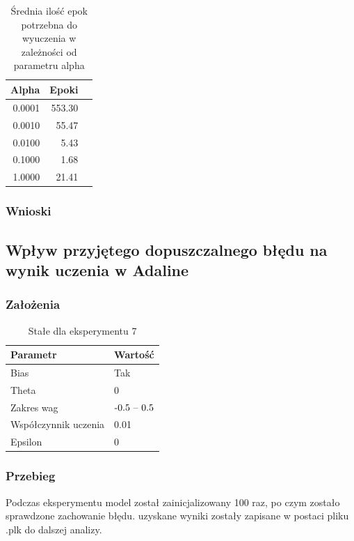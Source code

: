 \documentclass{article}
\begin{document}
\begin{table}[!h]
	\caption{Średnia ilość epok potrzebna do wyuczenia w zależności od parametru alpha}
	\label{tabela-res-6}
	\centering
	\begin{tabular}{rrr}
		\toprule
		Alpha  & Epoki  \\
		\midrule
		0.0001 & 553.30 \\
		0.0010 & 55.47  \\
		0.0100 & 5.43   \\
		0.1000 & 1.68   \\
		1.0000 & 21.41  \\
		\bottomrule
	\end{tabular}
\end{table}

\subsubsection*{Wnioski}

\newpage
\subsection{Wpływ przyjętego dopuszczalnego błędu na wynik uczenia w Adaline}
\subsubsection*{Założenia}
\begin{table}[!h]
	\caption{Stałe dla eksperymentu 7}
	\label{tabela-const-7}
	\centering
	\begin{tabular}{ll}
		\toprule
		Parametr               & Wartość         \\
		\midrule
		Bias                   & Tak               \\
		Theta                  & 0                 \\
		Zakres wag             & \($-0.5 -- 0.5$\) \\
		Współczynnik uczenia & 0.01              \\
		Epsilon                & 0                 \\
		\bottomrule
	\end{tabular}
\end{table}
\subsubsection*{Przebieg}

Podczas eksperymentu model został zainicjalizowany 100 raz, po czym zostało sprawdzone zachowanie błędu. uzyskane wyniki zostały zapisane w postaci pliku .plk do dalszej analizy.
\end{document}
